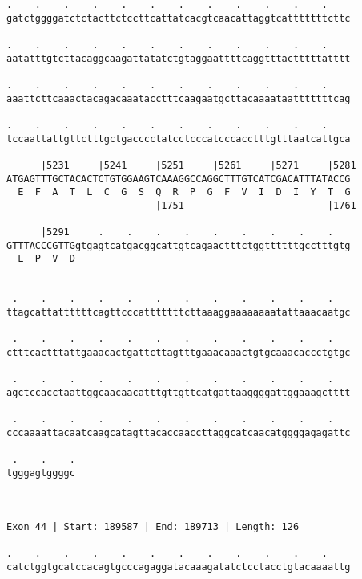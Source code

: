 \documentclass{article}
\begin{document}
\begin{Verbatim}
.    .    .    .    .    .    .    .    .    .    .    .    
gatctggggatctctacttctccttcattatcacgtcaacattaggtcatttttttcttc
                                                            
.    .    .    .    .    .    .    .    .    .    .    .    
aatatttgtcttacaggcaagattatatctgtaggaattttcaggtttactttttatttt
                                                            
.    .    .    .    .    .    .    .    .    .    .    .    
aaattcttcaaactacagacaaatacctttcaagaatgcttacaaaataatttttttcag
                                                            
.    .    .    .    .    .    .    .    .    .    .    .    
tccaattattgttctttgctgacccctatcctcccatcccacctttgtttaatcattgca
                                                            
      |5231     |5241     |5251     |5261     |5271     |5281
ATGAGTTTGCTACACTCTGTGGAAGTCAAAGGCCAGGCTTTGTCATCGACATTTATACCG
  E  F  A  T  L  C  G  S  Q  R  P  G  F  V  I  D  I  Y  T  G
                          |1751                         |1761
  
      |5291     .    .    .    .    .    .    .    .    .   
GTTTACCCGTTGgtgagtcatgacggcattgtcagaactttctggttttttgcctttgtg
  L  P  V  D                                                
                                                            
  
 .    .    .    .    .    .    .    .    .    .    .    .   
ttagcattattttttcagttcccatttttttcttaaaggaaaaaaaatattaaacaatgc
                                                            
 .    .    .    .    .    .    .    .    .    .    .    .   
ctttcactttattgaaacactgattcttagtttgaaacaaactgtgcaaacaccctgtgc
                                                            
 .    .    .    .    .    .    .    .    .    .    .    .   
agctccacctaattggcaacaacatttgttgttcatgattaaggggattggaaagctttt
                                                            
 .    .    .    .    .    .    .    .    .    .    .    .   
cccaaaattacaatcaagcatagttacaccaaccttaggcatcaacatggggagagattc
                                                            
 .    .    .
tgggagtggggc
            
            
 
Exon 44 | Start: 189587 | End: 189713 | Length: 126
 
.    .    .    .    .    .    .    .    .    .    .    .    
catctggtgcatccacagtgcccagaggatacaaagatatctcctacctgtacaaaattg
                                                            

\end{Verbatim}
\end{document}
